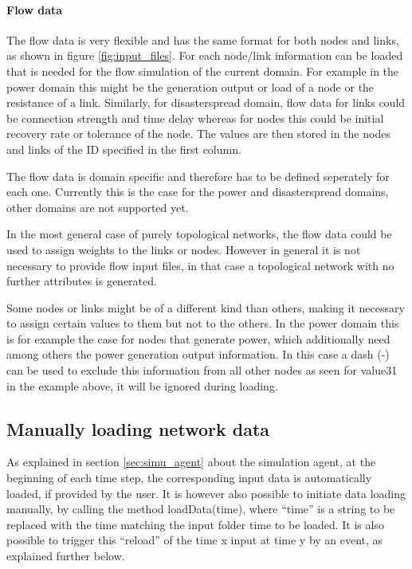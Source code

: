 \documentclass[11pt,fleqn]{book} %
\newcommand{\mainagent}{simulation agent}
\newcommand{\domain}[1][]{domain#1}
\begin{document}
\paragraph{Flow data} The flow data is very flexible and has the same format for both nodes and links, as shown in figure \ref{fig:input_files}. For each node/link information can be loaded that is needed for the flow simulation of the current \domain{}. For example in the power \domain{} this might be the generation output or load of a node or the resistance of a link. Similarly, for disaster\textunderscore spread \domain{}, flow data for links could be connection strength and time delay whereas for nodes this could be initial recovery rate or tolerance of the node. The values are then stored in the nodes and links of the ID specified in the first column.

The flow data is \domain{} specific and therefore has to be defined seperately for each one. Currently this is the case for the power and disaster\textunderscore spread \domain{s}, other \domain{s} are not supported yet.

In the most general case of purely topological networks, the flow data could be used to assign weights to the links or nodes. However in general it is not necessary to provide flow input files, in that case a topological network with no further attributes is generated.

Some nodes or links might be of a different kind than others, making it necessary to assign certain values to them but not to the others. In the power \domain{} this is for example the case for nodes that generate power, which additionally need among others the power generation output information. In this case a dash (-) can be used to exclude this information from all other nodes as seen for value31 in the example above, it will be ignored during loading. 

\subsection{Manually loading network data}
As explained in section \ref{sec:simu_agent} about the \mainagent, at the beginning of each time step, the corresponding input data is automatically loaded, if provided by the user. It is however also possible to initiate data loading manually, by calling the method loadData(time), where “time” is a string to be replaced with the time matching the input folder time to be loaded. It is also possible to trigger this “reload” of the time x input at time y by an event, as explained further below.
\end{document}
